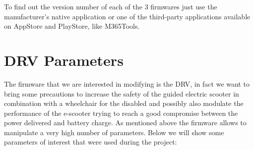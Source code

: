 \documentclass[binding=0.6cm,LaM,noexaminfo]{sapthesis}
\begin{document}
\noindent To find out the version number of each of the 3 firmwares just use the manufacturer's native application or one of the third-party applications available on AppStore and PlayStore, like M365Tools.

\section{DRV Parameters}
The firmware that we are interested in modifying is the DRV, in fact we want to bring some precautions to increase the safety of the guided electric scooter in combination with a wheelchair for the disabled and possibly also modulate the performance of the e-scooter trying to reach a good compromise between the power delivered and battery charge. As mentioned above the firmware allows to manipulate a very high number of parameters. Below we will show some parameters of interest that were used during the project:
\end{document}
